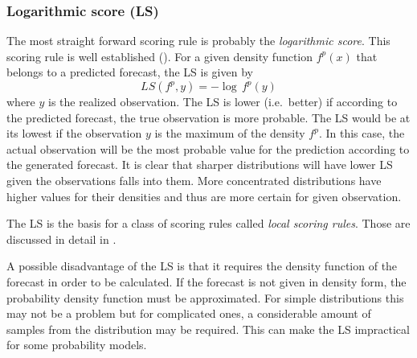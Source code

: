 \documentclass[12pt,a4paper,twoside]{scrartcl}
\numberwithin{equation}{section}
\begin{document}
\subsubsection{Logarithmic score (LS)}\label{sec:ls}
The most straight forward scoring rule is probably the \emph{logarithmic score}. This scoring rule is well established (\cite{good1952}). For a given density function \(f^p(x)\) that belongs to a predicted forecast, the LS is given by
\begin{equation}
  LS(f^p,y) = -\log \, f^p(y)
\end{equation}
where \(y\) is the realized observation. The LS is lower (i.e.\ better) if according to the predicted forecast, the true observation is more probable. The LS would be at its lowest if the observation \(y\) is the maximum of the density \(f^p\). In this case, the actual observation will be the most probable value for the prediction according to the generated forecast. It is clear that sharper distributions will have lower LS given the observations falls into them. More concentrated distributions have higher values for their densities and thus are more certain for given observation.

The LS is the basis for a class of scoring rules called \emph{local scoring rules}. Those are discussed in detail in \cite{ehm2012}.

A possible disadvantage of the LS is that it requires the density function of the forecast in order to be calculated. If the forecast is not given in density form, the probability density function must be approximated. For simple distributions this may not be a problem but for complicated ones, a considerable amount of samples from the distribution may be required. This can make the LS impractical for some probability models.
\end{document}
